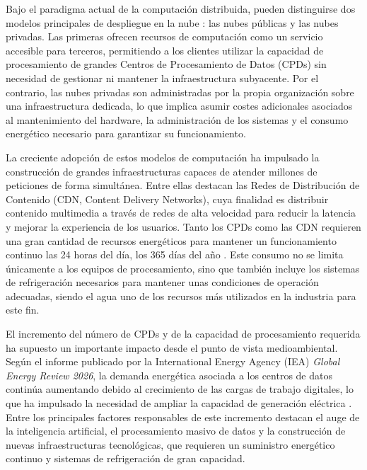 Bajo el paradigma actual de la computación distribuida, pueden distinguirse dos modelos principales de despliegue en la nube \cite{cloud-bases}: las nubes públicas y las nubes privadas. Las primeras ofrecen recursos de computación como un servicio accesible para terceros, permitiendo a los clientes utilizar la capacidad de procesamiento de grandes Centros de Procesamiento de Datos (CPDs) sin necesidad de gestionar ni mantener la infraestructura subyacente. Por el contrario, las nubes privadas son administradas por la propia organización sobre una infraestructura dedicada, lo que implica asumir costes adicionales asociados al mantenimiento del hardware, la administración de los sistemas y el consumo energético necesario para garantizar su funcionamiento.

La creciente adopción de estos modelos de computación ha impulsado la construcción de grandes infraestructuras capaces de atender millones de peticiones de forma simultánea. Entre ellas destacan las Redes de Distribución de Contenido (CDN, Content Delivery Networks), cuya finalidad es distribuir contenido multimedia a través de redes de alta velocidad para reducir la latencia y mejorar la experiencia de los usuarios. Tanto los CPDs como las CDN requieren una gran cantidad de recursos energéticos para mantener un funcionamiento continuo las 24 horas del día, los 365 días del año \cite{cpds-consumption-energy}. Este consumo no se limita únicamente a los equipos de procesamiento, sino que también incluye los sistemas de refrigeración necesarios para mantener unas condiciones de operación adecuadas, siendo el agua uno de los recursos más utilizados en la industria para este fin.

El incremento del número de CPDs y de la capacidad de procesamiento requerida ha supuesto un importante impacto desde el punto de vista medioambiental. Según el informe publicado por la International Energy Agency (IEA) \textit{Global Energy Review 2026}\cite{iae-report-consumption}, la demanda energética asociada a los centros de datos continúa aumentando debido al crecimiento de las cargas de trabajo digitales, lo que ha impulsado la necesidad de ampliar la capacidad de generación eléctrica \cite{iae-report-generation}. Entre los principales factores responsables de este incremento destacan el auge de la inteligencia artificial, el procesamiento masivo de datos y la construcción de nuevas infraestructuras tecnológicas, que requieren un suministro energético continuo y sistemas de refrigeración de gran capacidad.\

